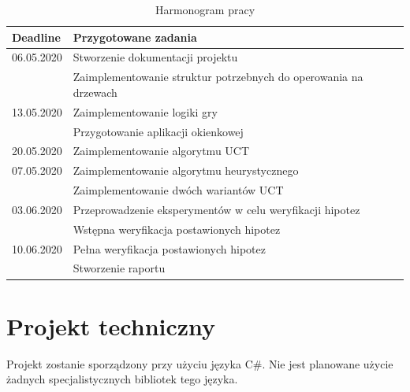 \documentclass[a4paper,12pt]{article}
\let\oldsection\section
\renewcommand\section{\clearpage\oldsection}
\begin{document}
\begin{table}[h!]
	\centering
	\caption{Harmonogram pracy}
	\label{tab:schedule}
	\smallskip
	\begin{tabular}{|l|l|}
		\hline
		\textbf{Deadline}   & \textbf{Przygotowane zadania} \\ \hline
		
		06.05.2020 	& Stworzenie dokumentacji projektu \\ 
		& Zaimplementowanie struktur potrzebnych do operowania na drzewach \\ \hline
		
		13.05.2020  & Zaimplementowanie logiki gry \\
		& Przygotowanie aplikacji okienkowej \\ \hline
		
		20.05.2020	& Zaimplementowanie algorytmu UCT  \\ \hline
		
		07.05.2020	&  Zaimplementowanie algorytmu heurystycznego \\ 
		& Zaimplementowanie dwóch wariantów UCT \\ \hline
		
		03.06.2020	& Przeprowadzenie eksperymentów w celu weryfikacji hipotez \\ 
		&  Wstępna weryfikacja postawionych hipotez \\ \hline
		
		10.06.2020	& Pełna weryfikacja postawionych hipotez \\ 
		& Stworzenie raportu \\ \hline
	\end{tabular}
\end{table}


\section{Projekt techniczny}
Projekt zostanie sporządzony przy użyciu języka C\#. Nie jest planowane użycie żadnych specjalistycznych bibliotek tego języka.
\end{document}
